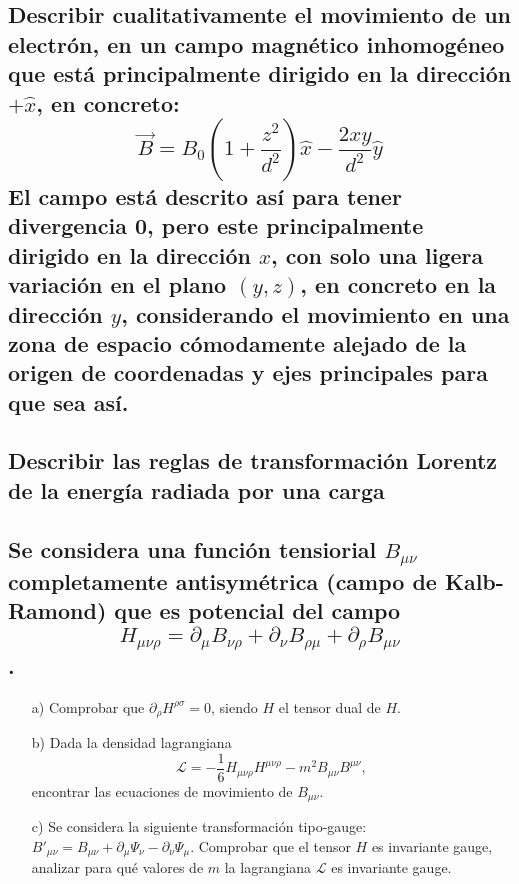 \documentclass{article}
\begin{document}
\subsection{Describir cualitativamente el movimiento de un electrón, en un campo magnético inhomogéneo que está principalmente dirigido en la dirección $+\hat{x}$, en concreto: 
\[
\vec{B} = B_0 \left( 1 + \frac{z^2}{d^2} \right) \hat{x} - \frac{2xy}{d^2} \hat{y}
\]
El campo está descrito así para tener divergencia 0, pero este principalmente dirigido en la dirección $x$, con solo una ligera variación en el plano $(y,z)$, en concreto en la dirección $y$, considerando el movimiento en una zona de espacio cómodamente alejado de la origen de coordenadas y ejes principales para que sea así.}

\subsection{Describir las reglas de transformación Lorentz de la energía radiada por una carga}



\subsection{Se considera una función tensiorial $B_{\mu\nu}$ completamente antisymétrica (campo de Kalb-Ramond) que es potencial del campo \[H_{\mu\nu\rho} = \partial_{\mu} B_{\nu\rho} + \partial_{\nu} B_{\rho\mu} + \partial_{\rho} B_{\mu\nu}\].}



\begin{enumerate}
    \item[a)] Comprobar que $\partial_{\rho} H^{\rho \sigma} = 0$, siendo $H$ el tensor dual de $H$.
    \item[b)] Dada la densidad lagrangiana 
    \[
    \mathcal{L} = - \frac{1}{6} H_{\mu\nu\rho} H^{\mu\nu\rho} - m^2 B_{\mu\nu} B^{\mu\nu},
    \]
    encontrar las ecuaciones de movimiento de $B_{\mu\nu}$.
    \item[c)] Se considera la siguiente transformación tipo-gauge: $B'_{\mu\nu} = B_{\mu\nu} + \partial_{\mu} \Psi_{\nu} - \partial_{\nu} \Psi_{\mu}$.
    Comprobar que el tensor $H$ es invariante gauge, analizar para qué valores de $m$ la lagrangiana $\mathcal{L}$ es invariante gauge.
\end{enumerate}
\end{document}
